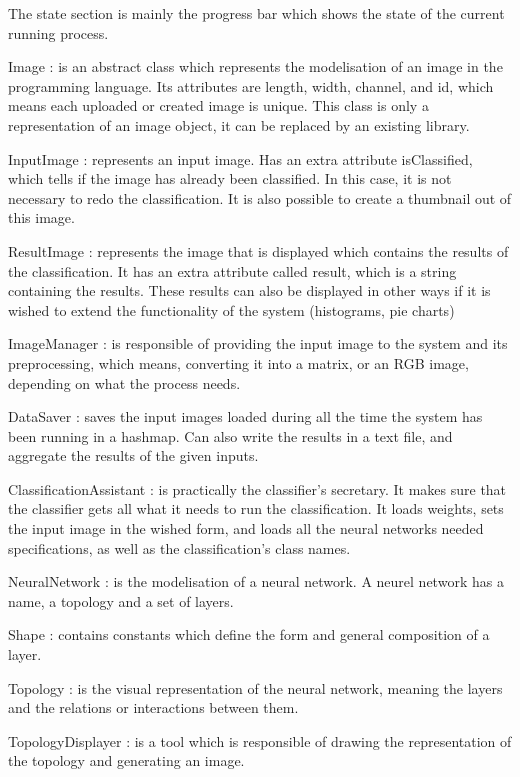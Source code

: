 \documentclass[parskip=full]{scrartcl}
\begin{document}
  The state section is mainly the progress bar which shows the state of the current running process.




Image : is an abstract class which represents the modelisation of an image in the programming language. Its attributes are length, width, channel, and id, which means each uploaded or created image is unique. This class is only a representation of an image object, it can be replaced by an existing library.

InputImage : represents an input image. Has an extra attribute isClassified, which tells if the image has already been classified. In this case, it is not necessary to redo the classification. It is also possible to create a thumbnail out of this image.

ResultImage : represents the image that is displayed which contains the results of the classification. It has an extra attribute called result, which is a string containing the results. These results can also be displayed in other ways if it is wished to extend the functionality of the system (histograms, pie charts)

ImageManager : is responsible of providing the input image to the system and its preprocessing, which means, converting it into a matrix, or an RGB image, depending on what the process needs.

DataSaver : saves the input images loaded during all the time the system has been running in a hashmap. Can also write the results in a text file, and aggregate the results of the given inputs.

ClassificationAssistant : is practically the classifier's secretary. It makes sure that the classifier gets all what it needs to run the classification. It loads weights, sets the input image in the wished form, and loads all the neural networks needed specifications, as well as the classification's class names.

NeuralNetwork : is the modelisation of a neural network. A neurel network has a name, a topology and a set of layers.

Shape : contains constants which define the form and general composition of a layer.

Topology : is the visual representation of the neural network, meaning the layers and the relations or interactions between them.

TopologyDisplayer : is a tool which is responsible of drawing the representation of the topology and generating an image.
\end{document}
